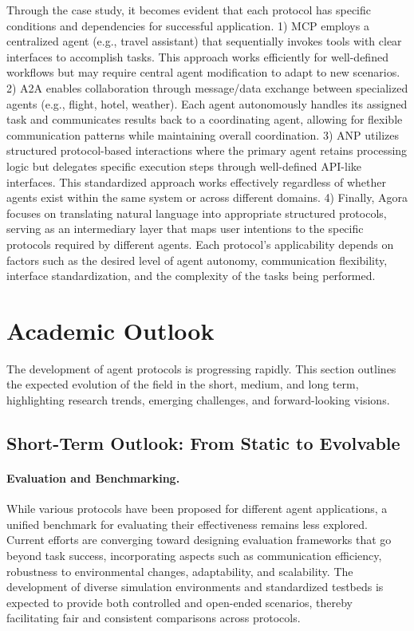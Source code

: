 \documentclass[10pt,preprint]{article}
\begin{document}
Through the case study, it becomes evident that each protocol has specific conditions and dependencies for successful application.  1) MCP employs a centralized agent (e.g., travel assistant) that sequentially invokes tools with clear interfaces to accomplish tasks.  This approach works efficiently for well-defined workflows but may require central agent modification to adapt to new scenarios.  2) A2A enables collaboration through message/data exchange between specialized agents (e.g., flight, hotel, weather).  Each agent autonomously handles its assigned task and communicates results back to a coordinating agent, allowing for flexible communication patterns while maintaining overall coordination.  3) ANP utilizes structured protocol-based interactions where the primary agent retains processing logic but delegates specific execution steps through well-defined API-like interfaces.  This standardized approach works effectively regardless of whether agents exist within the same system or across different domains.  4) Finally, Agora focuses on translating natural language into appropriate structured protocols, serving as an intermediary layer that maps user intentions to the specific protocols required by different agents.  Each protocol's applicability depends on factors such as the desired level of agent autonomy, communication flexibility, interface standardization, and the complexity of the tasks being performed.

\section{Academic Outlook}
The development of agent protocols is progressing rapidly. 
This section outlines the expected evolution of the field in the short, medium, and long term, highlighting research trends, emerging challenges, and forward-looking visions.

\subsection{Short-Term Outlook: From Static to Evolvable}
\paragraph{Evaluation and Benchmarking.}
While various protocols have been proposed for different agent applications, a unified benchmark for evaluating their effectiveness remains less explored. 
Current efforts are converging toward designing evaluation frameworks that go beyond task success, incorporating aspects such as communication efficiency, robustness to environmental changes, adaptability, and scalability. 
The development of diverse simulation environments and standardized testbeds is expected to provide both controlled and open-ended scenarios, thereby facilitating fair and consistent comparisons across protocols.
\end{document}
